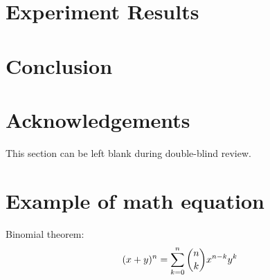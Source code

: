 \documentclass[10pt]{cai}
\begin{document}
\section{Experiment Results}
\label{results}




\section{Conclusion}


\section*{Acknowledgements}
This section can be left blank during double-blind review. 

\appendix

\section{Example of math equation }
Binomial theorem: \cite{abramowitz1948handbook}
\begin{equation}
(x+y)^n=\sum_{\substack{k=0}}^{n}\dbinom{n}{k}x^{n-k}y^k
\end{equation}


\printbibliography[heading=subbibintoc]
\end{document}
